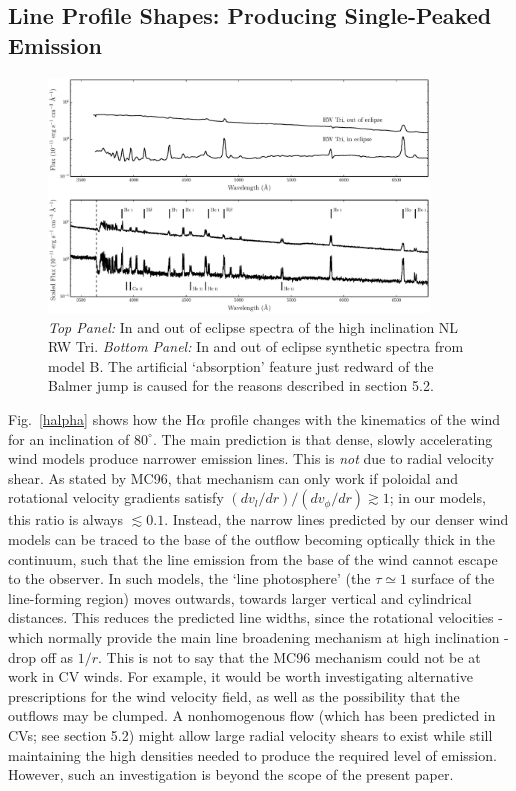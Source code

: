 \documentclass[preprint, a4paper, 11pt]{aastex}
\begin{document}
\subsection{Line Profile Shapes: Producing Single-Peaked Emission}

\begin{figure} %
\includegraphics[width=0.9\textwidth]{figures/fig13.eps}
\caption{{\sl Top Panel:} In and out of eclipse spectra of the high
inclination NL RW Tri. {\sl Bottom Panel:} In and out of eclipse synthetic
spectra from model B.
The artificial `absorption' feature just redward of the Balmer jump
is caused for the reasons described in section 5.2.}
\label{rwtricomp}
\end{figure} %


Fig.~\ref{halpha} shows how the H$\alpha$ profile changes with the kinematics of the wind for 
an inclination of $80^\circ$. The main prediction is that dense, slowly accelerating 
wind models produce narrower emission lines. This is {\em not} due to radial 
velocity shear. As stated by MC96, that mechanism can only work if poloidal 
and rotational velocity gradients satisfy $(dv_l/dr)/(dv_\phi/dr) \gtrsim 1$; in 
our models, this ratio is always $\lesssim 0.1$. Instead, the narrow lines predicted 
by our denser wind models can be traced to the base of the outflow becoming optically 
thick in the continuum, such that the line emission from the base of the wind
cannot escape to the observer. In such models, the `line photosphere'
(the $\tau \simeq 1$ surface of the line-forming region) moves outwards, towards larger 
vertical and cylindrical distances. This reduces the predicted line widths, since the 
rotational velocities - which normally provide the main line broadening mechanism at 
high inclination - drop off as $1/r$. This is not to say that the MC96 
mechanism could not be at work in CV winds. For example, it would be worth investigating
alternative prescriptions for the wind velocity field, as well as the possibility that the 
outflows may be clumped. A nonhomogenous flow 
(which has been predicted in CVs; see section 5.2)
might allow large radial velocity shears to exist while still 
maintaining the high densities needed to produce the required level of emission.
However, such an investigation is beyond the scope of the present paper.
\end{document}
